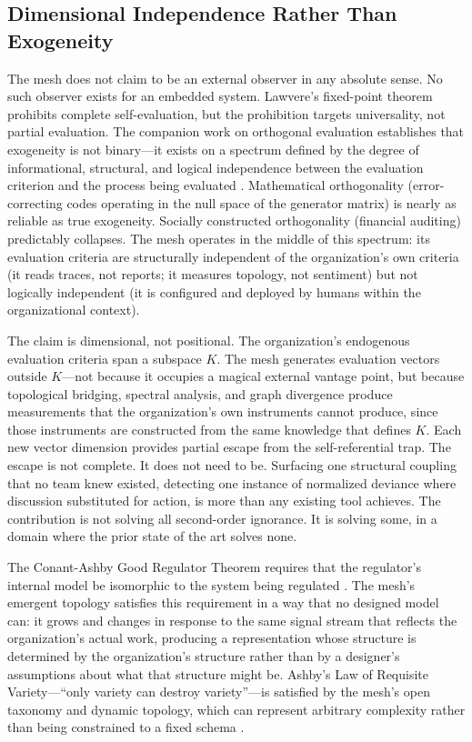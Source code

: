 \documentclass[11pt,a4paper]{article}
\begin{document}
\subsection{Dimensional Independence Rather Than Exogeneity}
\label{sec:external}

The mesh does not claim to be an external observer in any absolute sense. No such observer exists for an embedded system. Lawvere's fixed-point theorem prohibits complete self-evaluation, but the prohibition targets universality, not partial evaluation. The companion work on orthogonal evaluation establishes that exogeneity is not binary---it exists on a spectrum defined by the degree of informational, structural, and logical independence between the evaluation criterion and the process being evaluated \citep{mcentire2026b}. Mathematical orthogonality (error-correcting codes operating in the null space of the generator matrix) is nearly as reliable as true exogeneity. Socially constructed orthogonality (financial auditing) predictably collapses. The mesh operates in the middle of this spectrum: its evaluation criteria are structurally independent of the organization's own criteria (it reads traces, not reports; it measures topology, not sentiment) but not logically independent (it is configured and deployed by humans within the organizational context).

The claim is dimensional, not positional. The organization's endogenous evaluation criteria span a subspace $K$. The mesh generates evaluation vectors outside $K$---not because it occupies a magical external vantage point, but because topological bridging, spectral analysis, and graph divergence produce measurements that the organization's own instruments cannot produce, since those instruments are constructed from the same knowledge that defines $K$. Each new vector dimension provides partial escape from the self-referential trap. The escape is not complete. It does not need to be. Surfacing one structural coupling that no team knew existed, detecting one instance of normalized deviance where discussion substituted for action, is more than any existing tool achieves. The contribution is not solving all second-order ignorance. It is solving some, in a domain where the prior state of the art solves none.

The Conant-Ashby Good Regulator Theorem requires that the regulator's internal model be isomorphic to the system being regulated \citep{conant1970}. The mesh's emergent topology satisfies this requirement in a way that no designed model can: it grows and changes in response to the same signal stream that reflects the organization's actual work, producing a representation whose structure is determined by the organization's structure rather than by a designer's assumptions about what that structure might be. Ashby's Law of Requisite Variety---``only variety can destroy variety''---is satisfied by the mesh's open taxonomy and dynamic topology, which can represent arbitrary complexity rather than being constrained to a fixed schema \citep{ashby1956}.
\end{document}
